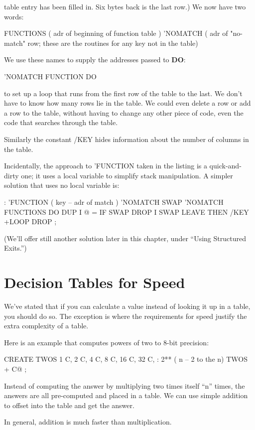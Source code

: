table entry has been filled in. Six bytes back is the last row.) We now have
two words:
\begin{Code}
FUNCTIONS  ( adr of beginning of function table )
'NOMATCH   ( adr of "no-match" row; these are the
             routines for any key not in the table)
\end{Code}
We use these names to supply the addresses passed to \textbf{DO}:
\begin{Code}
'NOMATCH FUNCTION DO
\end{Code}
to set up a loop that runs from the first row of the table to the last. We
don't have to know how many rows lie in the table. We could even delete a
row or add a row to the table, without having to change any other piece of
code, even the code that searches through the table.

Similarly the constant /KEY hides information about the number of
columns in the table.

Incidentally, the approach to 'FUNCTION taken in the listing is a
quick-and-dirty one; it uses a local variable to simplify stack
manipulation. A simpler solution that uses no local variable is:
\begin{Code}
: 'FUNCTION  ( key -- adr of match )
   'NOMATCH SWAP  'NOMATCH FUNCTIONS DO  DUP
      I @ =  IF SWAP DROP I SWAP  LEAVE  THEN
   /KEY +LOOP  DROP ;
\end{Code}
(We'll offer still another solution later in this chapter, under ``Using
Structured Exits.'')

\section{Decision Tables for Speed}

We've stated that if you can calculate a value instead of looking it up in a
table, you should do so. The exception is where the requirements for
speed justify the extra complexity of a table.

Here is an example that computes powers of two to 8-bit precision:

\begin{Code}
CREATE TWOS
   1 C,  2 C,  4 C,  8 C,  16 C,  32 C,
: 2**  ( n -- 2 to the n)
   TWOS +  C@ ;
\end{Code}
Instead of computing the answer by multiplying two times itself ``n''
times, the answers are all pre-computed and placed in a table. We can use
simple addition to offset into the table and get the answer.

In general, addition is much faster than multiplication.

